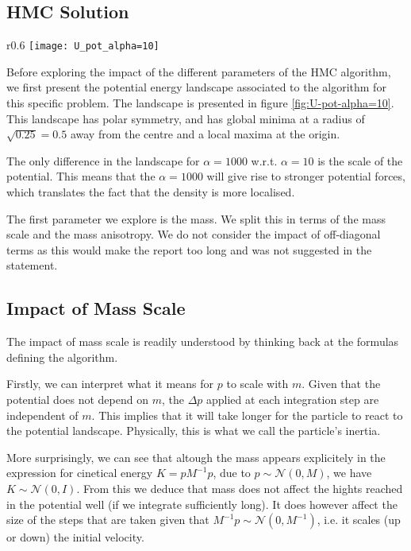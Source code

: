 \documentclass[a4paper, 12pt,oneside]{article}
\begin{document}
		\subsection{HMC Solution}
			\begin{wrapfigure}[16]{r}{0.6\textwidth}
				\centering
					\vspace{-4em}
					\texttt{[image: U\_pot\_alpha=10]}
					\caption{Potential energy landscape associated to HMC algorithm for $\alpha=10$. Version for $\alpha=1000$ is identical, except the vertical scale is multiplied by a factor 100.}
					\label{fig:U-pot-alpha=10}
			\end{wrapfigure}
			Before exploring the impact of the different parameters of the HMC algorithm, we first present the potential energy landscape associated to the algorithm for this specific problem. The landscape is presented in figure \ref{fig:U-pot-alpha=10}. 
			This landscape has polar symmetry, and has global minima at a radius of $\sqrt{0.25}=0.5$ away from the centre and a local maxima at the origin. 

			The only difference in the landscape for $\alpha=1000$ w.r.t. $\alpha=10$ is the scale of the potential. This means that the $\alpha=1000$ will give rise to stronger potential forces, which translates the fact that the density is more localised. 

			The first parameter we explore is the mass. We split this in terms of the mass scale and the mass anisotropy. We do not consider the impact of off-diagonal terms as this would make the report too long and was not suggested in the statement.
			\subsection{Impact of Mass Scale}
			The impact of mass scale is readily understood by thinking back at the formulas defining the algorithm.		
			
			Firstly, we can interpret what it means for $p$ to scale with $m$. Given that the potential does not depend on $m$, the $\Delta p$ applied at each integration step are independent of $m$. This implies that it will take longer for the particle to react to the potential landscape. Physically, this is what we call the particle's inertia.

			More surprisingly, we can see that altough the mass appears explicitely in the expression for cinetical energy $K=pM^{-1}p$, due to $p\sim\mathcal{N}(0,M)$, we have $K\sim\mathcal{N}(0,I)$. From this we deduce that mass does not affect the hights reached in the potential well (if we integrate sufficiently long). 
			It does however affect the size of the steps that are taken given that $M^{-1}p\sim\mathcal{N}(0,M^{-1})$, i.e. it scales (up or down) the initial velocity. 
\end{document}
